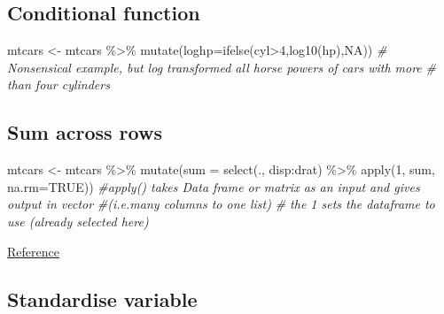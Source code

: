 \documentclass[
]{article}
\newenvironment{Shaded}{\begin{snugshade}}{\end{snugshade}}
\newcommand{\AttributeTok}[1]{\textcolor[rgb]{0.77,0.63,0.00}{#1}}
\newcommand{\CommentTok}[1]{\textcolor[rgb]{0.56,0.35,0.01}{\textit{#1}}}
\newcommand{\ConstantTok}[1]{\textcolor[rgb]{0.00,0.00,0.00}{#1}}
\newcommand{\DecValTok}[1]{\textcolor[rgb]{0.00,0.00,0.81}{#1}}
\newcommand{\FunctionTok}[1]{\textcolor[rgb]{0.00,0.00,0.00}{#1}}
\newcommand{\NormalTok}[1]{#1}
\newcommand{\OtherTok}[1]{\textcolor[rgb]{0.56,0.35,0.01}{#1}}
\newcommand{\SpecialCharTok}[1]{\textcolor[rgb]{0.00,0.00,0.00}{#1}}
\begin{document}
\hypertarget{conditional-function}{%
\subsection{Conditional function}\label{conditional-function}}

\begin{Shaded}
\begin{Highlighting}[]
\NormalTok{mtcars }\OtherTok{\textless{}{-}}\NormalTok{ mtcars }\SpecialCharTok{\%\textgreater{}\%} \FunctionTok{mutate}\NormalTok{(}\AttributeTok{loghp=}\FunctionTok{ifelse}\NormalTok{(cyl}\SpecialCharTok{\textgreater{}}\DecValTok{4}\NormalTok{,}\FunctionTok{log10}\NormalTok{(hp),}\ConstantTok{NA}\NormalTok{)) }
\CommentTok{\# Nonsensical example, but log transformed all horse powers of cars with more}
\CommentTok{\# than four cylinders}
\end{Highlighting}
\end{Shaded}

\hypertarget{sum-across-rows}{%
\subsection{Sum across rows}\label{sum-across-rows}}

\begin{Shaded}
\begin{Highlighting}[]
\NormalTok{mtcars }\OtherTok{\textless{}{-}}\NormalTok{ mtcars }\SpecialCharTok{\%\textgreater{}\%}  \FunctionTok{mutate}\NormalTok{(}\AttributeTok{sum =} \FunctionTok{select}\NormalTok{(., disp}\SpecialCharTok{:}\NormalTok{drat) }\SpecialCharTok{\%\textgreater{}\%} 
\FunctionTok{apply}\NormalTok{(}\DecValTok{1}\NormalTok{, sum, }\AttributeTok{na.rm=}\ConstantTok{TRUE}\NormalTok{))}
\CommentTok{\#apply() takes Data frame or matrix as an input and gives output in vector }
\CommentTok{\#(i.e.many columns to one list)}
\CommentTok{\# the \textquotesingle{}1\textquotesingle{} sets the dataframe to use (already selected here)}
\end{Highlighting}
\end{Shaded}

\href{https://stackoverflow.com/questions/28873057/sum-across-multiple-columns-with-dplyr}{Reference}

\hypertarget{standardise-variable}{%
\subsection{Standardise variable}\label{standardise-variable}}
\end{document}
